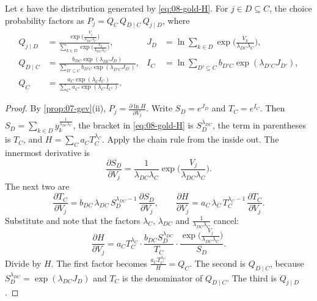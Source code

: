 \begin{proposition}\label{prop:08-gold-gev}
Let $\epsilon$ have the distribution generated by \eqref{eq:08-gold-H}. For $j \in D \subseteq C$, the choice
probability factors as $P_j = Q_C\,Q_{D \mid C}\,Q_{j \mid D}$, where
\begin{align*}
Q_{j \mid D} &= \frac{\exp\big(\frac{V_j}{\lambda_{DC}\lambda_C}\big)}{\sum_{k \in D}\exp\big(\frac{V_k}{\lambda_{DC}
\lambda_C}\big)}, &
J_D &= \ln\sum_{k \in D}\exp\Big(\frac{V_k}{\lambda_{DC}\lambda_C}\Big), \\
Q_{D \mid C} &= \frac{b_{DC}\exp(\lambda_{DC}J_D)}{\sum_{D' \subseteq C} b_{D'C}\exp(\lambda_{D'C}J_{D'})}, &
I_C &= \ln\sum_{D' \subseteq C} b_{D'C}\exp(\lambda_{D'C}J_{D'}), \\
Q_C &= \frac{a_C\exp(\lambda_C I_C)}{\sum_{C'} a_{C'}\exp(\lambda_{C'}I_{C'})} .
\end{align*}
\end{proposition}

\begin{proof}
By \cref{prop:07-gev}(ii), $P_j = \frac{\partial \ln H}{\partial V_j}$. Write $S_D = e^{J_D}$ and $T_C = e^{I_C}$.
Then $S_D = \sum_{k \in D} y_k^{\frac{1}{\lambda_{DC}\lambda_C}}$, the bracket in \eqref{eq:08-gold-H} is
$S_D^{\lambda_{DC}}$, the term in parentheses is $T_C$, and $H = \sum_C a_C T_C^{\lambda_C}$. Apply the chain rule from
the inside out. The innermost derivative is
\[
\frac{\partial S_D}{\partial V_j} = \frac{1}{\lambda_{DC}\lambda_C}\exp\Big(\frac{V_j}{\lambda_{DC}\lambda_C}\Big).
\]
The next two are
\[
\frac{\partial T_C}{\partial V_j} = b_{DC}\,\lambda_{DC}\,S_D^{\lambda_{DC} - 1}\,\frac{\partial S_D}{\partial V_j},
\qquad
\frac{\partial H}{\partial V_j} = a_C\,\lambda_C\,T_C^{\lambda_C - 1}\,\frac{\partial T_C}{\partial V_j} .
\]
Substitute and note that the factors $\lambda_C$, $\lambda_{DC}$ and $\frac{1}{\lambda_{DC}\lambda_C}$ cancel:
\[
\frac{\partial H}{\partial V_j} = a_C T_C^{\lambda_C}\cdot\frac{b_{DC}S_D^{\lambda_{DC}}}{T_C}\cdot
\frac{\exp\big(\frac{V_j}{\lambda_{DC}\lambda_C}\big)}{S_D} .
\]
Divide by $H$. The first factor becomes $\frac{a_C T_C^{\lambda_C}}{H} = Q_C$. The second is $Q_{D \mid C}$, because
$S_D^{\lambda_{DC}} = \exp(\lambda_{DC}J_D)$ and $T_C$ is the denominator of $Q_{D \mid C}$. The third is
$Q_{j \mid D}$.
\end{proof}

